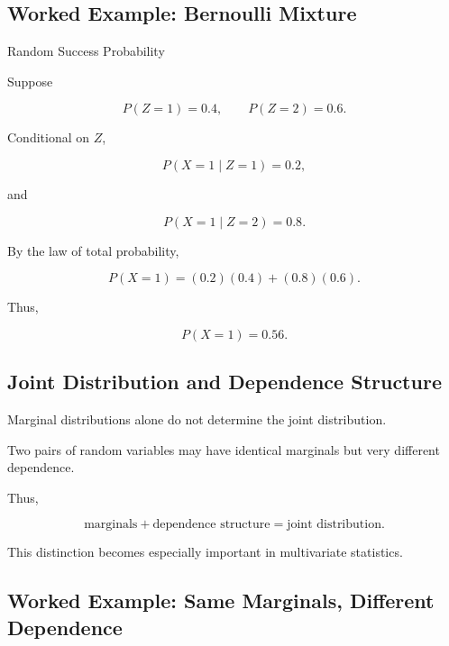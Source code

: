 \subsection{Worked Example: Bernoulli Mixture}
\label{subsec:worked-bernoulli-mixture}

\begin{workedexamplebox}{Random Success Probability}

Suppose

\[
P(Z=1)=0.4,
\qquad
P(Z=2)=0.6.
\]

Conditional on \(Z\),

\[
P(X=1\mid Z=1)=0.2,
\]

and

\[
P(X=1\mid Z=2)=0.8.
\]

By the law of total probability,

\[
P(X=1)
=
(0.2)(0.4)
+
(0.8)(0.6).
\]

Thus,

\begin{answerbox}
\[
\boxed{
P(X=1)=0.56.
}
\]
\end{answerbox}

\end{workedexamplebox}

\subsection{Joint Distribution and Dependence Structure}
\label{subsec:joint-distribution-dependence}

Marginal distributions alone do not determine the joint distribution.

Two pairs of random variables may have identical marginals but very
different dependence.

Thus,

\[
\boxed{
\text{marginals}
+
\text{dependence structure}
=
\text{joint distribution}.
}
\]

This distinction becomes especially important in multivariate
statistics.

\subsection{Worked Example: Same Marginals, Different Dependence}
\label{subsec:worked-same-marginals-different-dependence}

